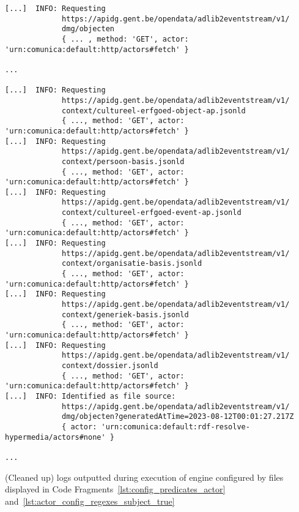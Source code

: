 \begin{listing}[htbp]
    \begin{verbatim}
[...]  INFO: Requesting
             https://apidg.gent.be/opendata/adlib2eventstream/v1/
             dmg/objecten
             { ... , method: 'GET', actor: 'urn:comunica:default:http/actors#fetch' }
             
...

[...]  INFO: Requesting
             https://apidg.gent.be/opendata/adlib2eventstream/v1/
             context/cultureel-erfgoed-object-ap.jsonld
             { ..., method: 'GET', actor: 'urn:comunica:default:http/actors#fetch' }
[...]  INFO: Requesting
             https://apidg.gent.be/opendata/adlib2eventstream/v1/
             context/persoon-basis.jsonld
             { ..., method: 'GET', actor: 'urn:comunica:default:http/actors#fetch' }
[...]  INFO: Requesting
             https://apidg.gent.be/opendata/adlib2eventstream/v1/
             context/cultureel-erfgoed-event-ap.jsonld
             { ..., method: 'GET', actor: 'urn:comunica:default:http/actors#fetch' }
[...]  INFO: Requesting
             https://apidg.gent.be/opendata/adlib2eventstream/v1/
             context/organisatie-basis.jsonld
             { ..., method: 'GET', actor: 'urn:comunica:default:http/actors#fetch' }
[...]  INFO: Requesting
             https://apidg.gent.be/opendata/adlib2eventstream/v1/
             context/generiek-basis.jsonld
             { ..., method: 'GET', actor: 'urn:comunica:default:http/actors#fetch' }
[...]  INFO: Requesting
             https://apidg.gent.be/opendata/adlib2eventstream/v1/
             context/dossier.jsonld
             { ..., method: 'GET', actor: 'urn:comunica:default:http/actors#fetch' }
[...]  INFO: Identified as file source:
             https://apidg.gent.be/opendata/adlib2eventstream/v1/
             dmg/objecten?generatedAtTime=2023-08-12T00:01:27.217Z
             { actor: 'urn:comunica:default:rdf-resolve-hypermedia/actors#none' }
             
...
    \end{verbatim}
    \caption{(Cleaned up) logs outputted during execution of engine configured by files displayed in Code Fragments~\ref{lst:config_predicates_actor} and~\ref{lst:actor_config_regexes_subject_true}}
    \label{lst:logs}
\end{listing}

